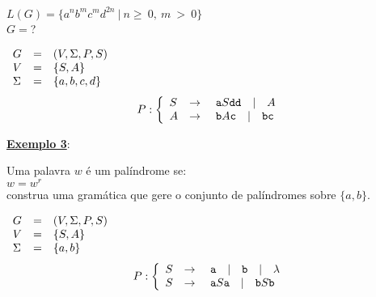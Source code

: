 \begin{center}
  $ L(G) = \{ a^{n}b^{m}c^{m}d^{2n} \ | \ n \geqslant \ 0,\  m  \ > \ 0 \}$ \\
  \vspace{1cm}
  {\color{red} $ G = ${\Huge ?} } \newline
  \makebox[\linewidth]{\rule{\paperwidth/2}{0.4pt}}
\end{center}
{\color{blue}
\begin{flushleft}
    $\begin{array}{l c l }
      G & = & (V, \Sigma, P, S) \\
      V & = & \{S, A\} \\
      \Sigma & = & \{a, b, c, d\} \\
    \end{array}$  
  \[
    P:\left\{
      \begin{array}{l c l}
        S & \rightarrow & \ \texttt{a}S\texttt{dd} \quad | \quad A \\
	A & \rightarrow & \ \texttt{b}A\texttt{c} \quad | \quad \texttt{bc}  \\
      \end{array}
      \right.
   \]  
\end{flushleft}
}
\vspace{1cm}
\textbf{\underline{Exemplo 3}}:\\

\begin{center}
Uma palavra $w$ é um palíndrome se: \\
$ w = w^{r} $ \\
construa uma gramática que gere o conjunto de palíndromes sobre $\{a, b\}$.
  \makebox[\linewidth]{\rule{\paperwidth/2}{0.4pt}}
\end{center}
{\color{blue}
\begin{flushleft}
    $\begin{array}{l c l }
      G & = & (V, \Sigma, P, S) \\
      V & = & \{S, A\} \\
      \Sigma & = & \{a, b\} \\
    \end{array}$  
  \[
    P:\left\{
      \begin{array}{l c l}
        S & \rightarrow & \ \texttt{a} \quad | \quad \texttt{b} \quad | \quad \lambda \\
	S & \rightarrow & \ \texttt{a}S\texttt{a} \quad | \quad \texttt{b}S\texttt{b} \\
      \end{array}
      \right.
   \]  
\end{flushleft}
}

